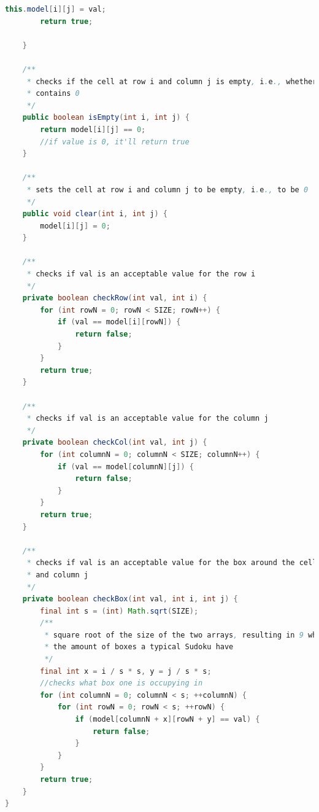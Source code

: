 \documentclass[a4paper,10pt]{article}
\begin{document}
\begin{lstlisting}[language=java]
        this.model[i][j] = val;
        return true;

    }

    /**
     * checks if the cell at row i and column j is empty, i.e., whether it
     * contains 0
     */
    public boolean isEmpty(int i, int j) {
        return model[i][j] == 0;
        //if value is 0, it'll return true
    }

    /**
     * sets the cell at row i and column j to be empty, i.e., to be 0
     */
    public void clear(int i, int j) {
        model[i][j] = 0;
    }

    /**
     * checks if val is an acceptable value for the row i
     */
    private boolean checkRow(int val, int i) {
        for (int rowN = 0; rowN < SIZE; rowN++) {
            if (val == model[i][rowN]) {
                return false;
            }
        }
        return true;
    }

    /**
     * checks if val is an acceptable value for the column j
     */
    private boolean checkCol(int val, int j) {
        for (int columnN = 0; columnN < SIZE; columnN++) {
            if (val == model[columnN][j]) {
                return false;
            }
        }
        return true;
    }

    /**
     * checks if val is an acceptable value for the box around the cell at row i
     * and column j
     */
    private boolean checkBox(int val, int i, int j) {
        final int s = (int) Math.sqrt(SIZE);
        /**
         * square root of the size of the two arrays, resulting in 9 which is
         * the amount of boxes a typical Sudoku have
         */
        final int x = i / s * s, y = j / s * s;
        //checks what box one is occupying in
        for (int columnN = 0; columnN < s; ++columnN) {
            for (int rowN = 0; rowN < s; ++rowN) {
                if (model[columnN + x][rowN + y] == val) {
                    return false;
                }
            }
        }
        return true;
    }
}
\end{lstlisting}
\newpage
\end{document}
